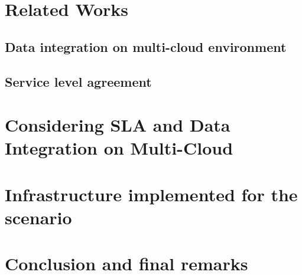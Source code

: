 \documentclass{llncs}
\begin{document}

  



\section{Related Works}\label{sec:rw}

\subsection{Data integration on multi-cloud environment}

\subsection{Service level agreement}



\section{Considering SLA and Data Integration on Multi-Cloud}

\section{Infrastructure implemented for the scenario}

\section{Conclusion and final remarks}\label{sec:conc}



 
\end{document}
